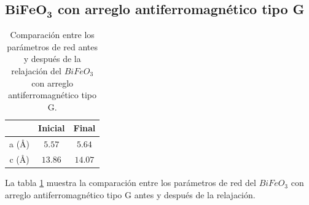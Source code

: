\subsection{$\mathbf{BiFeO_{3}}$ con arreglo antiferromagn\'etico tipo G}

\begin{table}[H]
    \begin{center}
        \caption{Comparaci\'on entre los par\'ametros de red antes y despu\'es 
            de la relajaci\'on del $BiFeO_{3}$ con arreglo antiferromagn\'etico 
            tipo G.}
        \begin{tabular}{ccc}
            \hline
            & \textbf{Inicial} \cite{tomar2018} & \textbf{Final} \\
            \hline \hline
            a (\AA) & $5.57$  & $5.64$   \\
            \hline
            c (\AA) & $13.86$ & $14.07$   \\
            \hline
        \end{tabular}
        \singlespace
        \label{bfo_g_ini_fin}
    \end{center}
\end{table}

\noindent La tabla \ref{bfo_g_ini_fin} muestra la comparaci\'on entre los 
par\'ametros de red del $BiFeO_{3}$ con arreglo antiferromagn\'etico tipo G 
antes y despu\'es de la relajaci\'on.

